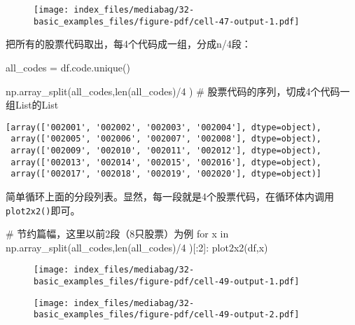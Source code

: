 \documentclass[
  letterpaper,
  DIV=11,
  numbers=noendperiod]{scrreprt}
\newenvironment{Shaded}{\begin{snugshade}}{\end{snugshade}}
\newcommand{\BuiltInTok}[1]{\textcolor[rgb]{0.00,0.23,0.31}{#1}}
\newcommand{\CommentTok}[1]{\textcolor[rgb]{0.37,0.37,0.37}{#1}}
\newcommand{\ControlFlowTok}[1]{\textcolor[rgb]{0.00,0.23,0.31}{#1}}
\newcommand{\DecValTok}[1]{\textcolor[rgb]{0.68,0.00,0.00}{#1}}
\newcommand{\KeywordTok}[1]{\textcolor[rgb]{0.00,0.23,0.31}{#1}}
\newcommand{\NormalTok}[1]{\textcolor[rgb]{0.00,0.23,0.31}{#1}}
\newcommand{\OperatorTok}[1]{\textcolor[rgb]{0.37,0.37,0.37}{#1}}
\begin{document}
\begin{figure}[H]

{\centering \texttt{[image: index\_files/mediabag/32-basic\_examples\_files/figure-pdf/cell-47-output-1.pdf]}

}

\end{figure}

把所有的股票代码取出，每4个代码成一组，分成n/4段：

\begin{Shaded}
\begin{Highlighting}[]
\NormalTok{all\_codes }\OperatorTok{=}\NormalTok{ df.code.unique()}

\NormalTok{np.array\_split(all\_codes,}\BuiltInTok{len}\NormalTok{(all\_codes)}\OperatorTok{/}\DecValTok{4}\NormalTok{ ) }\CommentTok{\# 股票代码的序列，切成4个代码一组List的List}
\end{Highlighting}
\end{Shaded}

\begin{verbatim}
[array(['002001', '002002', '002003', '002004'], dtype=object),
 array(['002005', '002006', '002007', '002008'], dtype=object),
 array(['002009', '002010', '002011', '002012'], dtype=object),
 array(['002013', '002014', '002015', '002016'], dtype=object),
 array(['002017', '002018', '002019', '002020'], dtype=object)]
\end{verbatim}

简单循环上面的分段列表。显然，每一段就是4个股票代码，在循环体内调用\texttt{plot2x2()}即可。

\begin{Shaded}
\begin{Highlighting}[]
\CommentTok{\# 节约篇幅，这里以前2段（8只股票）为例}
\ControlFlowTok{for}\NormalTok{ x }\KeywordTok{in}\NormalTok{ np.array\_split(all\_codes,}\BuiltInTok{len}\NormalTok{(all\_codes)}\OperatorTok{/}\DecValTok{4}\NormalTok{ )[:}\DecValTok{2}\NormalTok{]:}
\NormalTok{    plot2x2(df,x)}
\end{Highlighting}
\end{Shaded}

\begin{figure}[H]

{\centering \texttt{[image: index\_files/mediabag/32-basic\_examples\_files/figure-pdf/cell-49-output-1.pdf]}

}

\end{figure}

\begin{figure}[H]

{\centering \texttt{[image: index\_files/mediabag/32-basic\_examples\_files/figure-pdf/cell-49-output-2.pdf]}

}

\end{figure}
\end{document}
